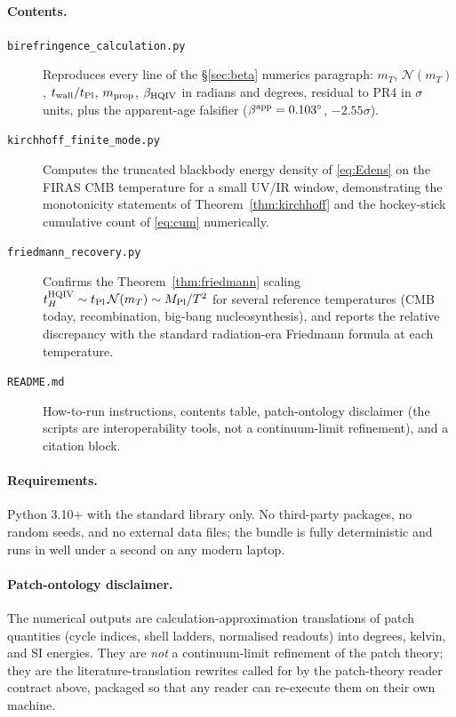 \documentclass[11pt]{amsart}
\begin{document}
\paragraph{Contents.}
\begingroup
\sloppy
\setlength{\emergencystretch}{4em}
\begin{description}
\item[\texttt{birefringence\_calculation.py}] Reproduces every line
  of the \S\ref{sec:beta} numerics paragraph: $m_T$,
  $\mathcal{N}(m_T)$, $t_{\rm wall}/t_{\rm Pl}$, $m_{\rm prop}$,
  $\beta_{\rm HQIV}$ in radians and degrees, residual to PR4 in
  $\sigma$ units, plus the apparent-age falsifier
  ($\beta^{\rm app}=0.103^\circ$, $-2.55\sigma$).
\item[\texttt{kirchhoff\_finite\_mode.py}] Computes the truncated
  blackbody energy density of \eqref{eq:Edens} on the FIRAS CMB
  temperature for a small UV/IR window, demonstrating the
  monotonicity statements of Theorem~\ref{thm:kirchhoff} and the
  hockey-stick cumulative count of \eqref{eq:cum} numerically.
\item[\texttt{friedmann\_recovery.py}] Confirms the
  Theorem~\ref{thm:friedmann} scaling
  $t_H^{\rm HQIV}\sim t_{\rm Pl}\,\mathcal{N}(m_T)\sim
  M_{\rm Pl}/T^{2}$ for several reference temperatures (CMB
  today, recombination, big-bang nucleosynthesis), and reports
  the relative discrepancy with the standard radiation-era
  Friedmann formula at each temperature.
\item[\texttt{README.md}] How-to-run instructions, contents
  table, patch-ontology disclaimer (the scripts are
  interoperability tools, not a continuum-limit refinement),
  and a citation block.
\end{description}
\endgroup

\paragraph{Requirements.}
Python 3.10+ with the standard library only.  No third-party
packages, no random seeds, and no external data files; the bundle
is fully deterministic and runs in well under a second on any
modern laptop.

\paragraph{Patch-ontology disclaimer.}
The numerical outputs are calculation-approximation translations
of patch quantities (cycle indices, shell ladders, normalised
readouts) into degrees, kelvin, and SI energies.  They are
\emph{not} a continuum-limit refinement of the patch theory; they
are the literature-translation rewrites called for by the
patch-theory reader contract above, packaged so that any reader
can re-execute them on their own machine.
\end{document}
